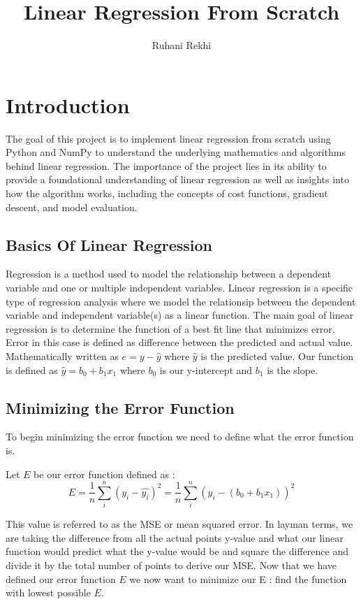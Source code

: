 \documentclass{article}
\title{Linear Regression From Scratch}
\author{Ruhani Rekhi}
\begin{document}
\maketitle


\section{Introduction}

The goal of this project is to implement linear regression from scratch using Python and NumPy to understand the underlying mathematics and algorithms behind linear regression.
The importance of the project lies in its ability to provide a foundational understanding of linear regression as well as insights into how the algorithm works, including the concepts of cost functions, gradient descent, and model evaluation.


\subsection{Basics Of Linear Regression}
Regression is a method used to model the relationship between a dependent variable and one or multiple independent variables. Linear regression is a specific type of regression analysis where we model the relationsip between the dependent variable and independent variable(s) as a linear function.
The main goal of linear regression is to determine the function of a best fit line that minimizes error. Error in this case is defined as difference between the predicted and actual value. Mathematically written as $ e = y - \hat{y}  $ where $\hat{y}$ is the predicted value. Our function is defined as $ \hat{y} = b_0 + b_1x_1 $ where $b_0$ is our y-intercept and $b_1$ is the slope. 

\subsection{Minimizing the Error Function}

To begin minimizing the error function we need to define what the error function is. 

Let $E$ be our error function defined as :
\[E = \frac{1}{n} \sum_{i}^{n}(y_i - \hat{y_i})^2
    = \frac{1}{n} \sum_{i}^{n}(y_i - (b_0 + b_1x_1))^2
\]


\noindent This value is referred to as the MSE or mean squared error. In layman terms, we are taking the difference from all the actual points y-value
and what our linear function would predict what the y-value would be and square the difference and divide it by the total number of points to 
derive our MSE. Now that we have defined our error function $E$ we now want to minimize our E : find the function with lowest possible $E$.
\end{document}
